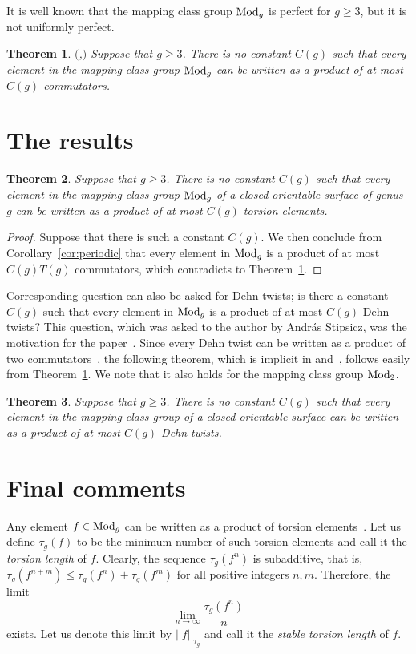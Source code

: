 \documentclass[11pt]{amsart}
\newtheorem{theorem}{Theorem}%
\theoremstyle{definition}
\theoremstyle{remark}
\def\mod{{\rm Mod}}
\begin{document}
It is well known that the mapping class group $\mod_g$ is perfect for
$g\geq 3$, but it is not uniformly perfect.

\begin{theorem} $($\cite{k},\cite{ek}$)$ \label{thm:stable}
Suppose that $g\geq 3$.
There is no constant $C(g)$ such that every element in the
mapping class group $\mod_g$ can be written as a product of at most $C(g)$
commutators.
 \end{theorem}


\section{The results}

\begin{theorem}  \label{result}
Suppose that $g\geq 3$.
There is no constant $C(g)$ such that every element in the mapping class group
$\mod_g$ of a closed orientable surface of genus $g$ can be written as a product of at most $C(g)$ 
torsion elements.
 \end{theorem}
\begin{proof}
Suppose that there is such a constant $C(g)$. We then conclude from 
Corollary~\ref{cor:periodic} that every element in $\mod_g$ is 
a product of at most $C(g)T(g)$ commutators, 
which contradicts to Theorem~\ref{thm:stable}.
\end{proof}

Corresponding question can also be asked for Dehn twists; is there a 
constant $C(g)$ such that every element in $\mod_g$ is a product of 
at most $C(g)$ Dehn twists? This question, which was asked to the author
by Andr\'as Stipsicz, was the motivation for the paper~\cite{k}.
Since every Dehn twist can be written as a product of two commutators~\cite{ko},
the following theorem, which is implicit in \cite{k} and~\cite{ek},
follows easily from Theorem~\ref{thm:stable}. We note that it also holds 
for the mapping class group $\mod_2$.

\begin{theorem}  
Suppose that $g\geq 3$.
There is no constant $C(g)$ such that every element in the mapping class group
of a closed orientable surface can be written as a product of at most $C(g)$ 
Dehn twists.
 \end{theorem}

\section{Final comments}
Any element $f\in\mod_g$ can be written as a product of torsion
elements~\cite{bf}. Let us define $\tau_g(f)$ to be the minimum number of such torsion 
elements and call it the {\it torsion length} of $f$. 
Clearly, the sequence $\tau_g(f^n)$ is subadditive, 
that is, $\tau_g(f^{n+m})\leq \tau_g(f^n)+\tau_g(f^m)$ for all positive integers $n,m$.
Therefore, the limit $$\lim_{n\to \infty}\frac{\tau_g(f^n)}{n}$$ exists. Let us denote this limit by
$||f||_{\tau_g}$ and call it the {\it stable torsion length} of $f$. 
\end{document}

